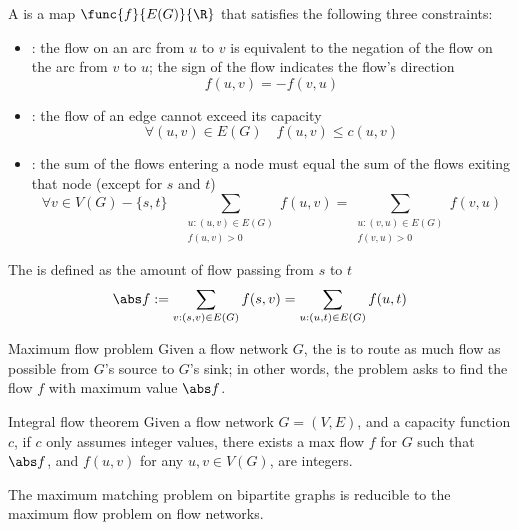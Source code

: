 \documentclass[a4paper, 12pt]{report}
\begin{document}
    A  is a map $\func{f}{E(G)}{\R}$ that satisfies the following three constraints:

    \begin{itemize}
        \item {}: the flow on an arc from $u$ to $v$ is equivalent to the negation of the flow on the arc from $v$ to $u$; the sign of the flow indicates the flow's direction $$f(u,v) = -f(v, u)$$
        \item {}: the flow of an edge cannot exceed its capacity $$\forall (u, v) \in E(G) \quad f(u, v) \le c(u, v)$$
        \item {}: the sum of the flows entering a node must equal the sum of the flows exiting that node (except for $s$ and $t$) $$\forall v \in V(G) - \{s, t\} \quad \sum_{\substack{u:(u, v) \in E(G) \\f(u, v) >0}}{f(u, v)} = \sum_{\substack{u:(v, u)\in E(G) \\ f(v, u) >0}}{f(v, u)}$$
    \end{itemize}

    The  is defined as the amount of flow passing from $s$ to $t$ $$\abs f := \sum_{v : (s, v) \in E(G)}{f(s, v)} = \sum_{u:(u, t)\in E(G)}{f(u, t)}$$

    \begin{frameddefn}{Maximum flow problem}
        Given a flow network $G$, the  is to route as much flow as possible from $G$'s source to $G$'s sink; in other words, the problem asks to find the flow $f$ with maximum value $\abs f$.
    \end{frameddefn}

    \begin{framedthm}[label={integral flow}]{Integral flow theorem}
        Given a flow network $G = (V, E)$, and a capacity function $c$, if $c$ only assumes integer values, there exists a max flow $f$ for $G$ such that $\abs f$, and $f(u, v)$ for any $u, v \in V(G)$, are integers.
    \end{framedthm}

    \begin{framedthm}{}
        The maximum matching problem on bipartite graphs is reducible to the maximum flow problem on flow networks.
    \end{framedthm}
\end{document}
